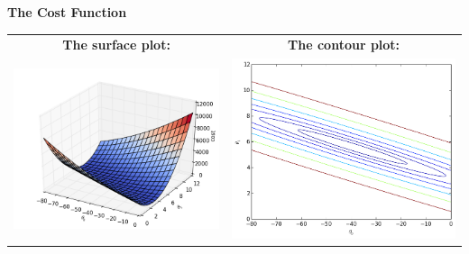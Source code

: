 \documentclass[xcolor=dvipsnames]{beamer}
\begin{document}
\begin{frame}
{\bf The Cost Function}
\begin{tabular}{c c}
{\bf The surface plot: } & {\bf The contour plot: }\\
\includegraphics[scale=.33]{cost.png} & \includegraphics[scale=.25]{costContour.png}\\
\end{tabular}
\end{frame}
\end{document}

